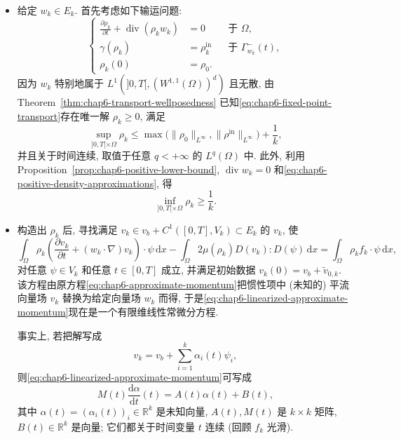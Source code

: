 \begin{sloppypar}
\begin{itemize}
 \item 给定 $w_k\in E_k$. 首先考虑如下输运问题:
 \begin{equation}
 \left\{
 \begin{aligned}
  \frac{\partial\rho_k}{\partial t}+\operatorname{div}(\rho_kw_k)&=0&&\text{于 }\Omega,\\
  \gamma(\rho_k)&=\rho_k^{\mathrm{in}}&&\text{于 }\Gamma_{w_k}^-(t),\\
  \rho_k(0)&=\rho_0.
 \end{aligned}
 \right.
 \label{eq:chap6-fixed-point-transport}
 \end{equation}
 因为 $w_k$ 特别地属于 $L^1(]0,T[,(W^{1,1}(\Omega))^d)$ 且无散, 由 Theorem~\ref{thm:chap6-transport-wellposedness} 已知\eqref{eq:chap6-fixed-point-transport}存在唯一解 $\rho_k\geq0$, 满足
 \begin{equation}
  \sup_{]0,T[\times\Omega}\rho_k
  \leq\max\bigl(\|\rho_0\|_{L^\infty},\|\rho^{\mathrm{in}}\|_{L^\infty}\bigr)+\frac1k,
 \label{eq:chap6-approximate-density-upper-bound}
 \end{equation}
 并且关于时间连续, 取值于任意 $q<+\infty$ 的 $L^q(\Omega)$ 中. 此外, 利用 Proposition~\ref{prop:chap6-positive-lower-bound}, $\operatorname{div}w_k=0$ 和\eqref{eq:chap6-positive-density-approximations}, 得
 \begin{equation}
  \inf_{]0,T[\times\Omega}\rho_k\geq\frac1k.
 \label{eq:chap6-approximate-density-lower-bound}
 \end{equation}

 \item 构造出 $\rho_k$ 后, 寻找满足
 $v_k\in v_b+C^1([0,T],V_k)\subset E_k$ 的 $v_k$, 使
 \begin{equation}
  \int_\Omega\rho_k\left(\frac{\partial v_k}{\partial t}+(w_k\cdot\nabla)v_k\right)\cdot\psi\,\mathrm dx
 -\int_\Omega2\mu(\rho_k)D(v_k):D(\psi)\,\mathrm dx
  =\int_\Omega\rho_kf_k\cdot\psi\,\mathrm dx,
 \label{eq:chap6-linearized-approximate-momentum}
 \end{equation}
 对任意 $\psi\in V_k$ 和任意 $t\in[0,T]$ 成立, 并满足初始数据 $v_k(0)=v_b+\widetilde v_{0,k}$. 该方程由原方程\eqref{eq:chap6-approximate-momentum}把惯性项中 (未知的) 平流向量场 $v_k$ 替换为给定向量场 $w_k$ 而得, 于是\eqref{eq:chap6-linearized-approximate-momentum}现在是一个有限维线性常微分方程.

 事实上, 若把解写成
 \[
  v_k=v_b+\sum_{i=1}^k\alpha_i(t)\psi_i,
 \]
 则\eqref{eq:chap6-linearized-approximate-momentum}可写成
 \begin{equation}
  M(t)\frac{\mathrm d\alpha}{\mathrm dt}(t)=A(t)\alpha(t)+B(t),
 \label{eq:chap6-finite-dimensional-ode}
 \end{equation}
 其中 $\alpha(t)=(\alpha_i(t))_i\in\mathbb R^k$ 是未知向量, $A(t),M(t)$ 是 $k\times k$ 矩阵, $B(t)\in\mathbb R^k$ 是向量; 它们都关于时间变量 $t$ 连续 (回顾 $f_k$ 光滑).


\end{itemize}
\end{sloppypar}

